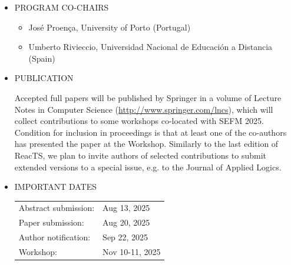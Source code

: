 \documentclass[prodmode,acmtecs]{acmsmall} %
\begin{document}
{\begin{itemize}
\begin{itemize}\item  FULL PAPERS up to 12 pages (excluding references) – to present original research and the analysis, interpretation and validation of the research findings.
\item  SHORT PRESENTATIONS up to 4 pages (excluding references) – to present work in progress and preliminary results.
\end{itemize} 
  Both kinds of submissions allow system descriptions,  to present a new tool, a new tool component or novel extensions to an existing tool aiming at supporting open community approaches, or the use/customisation of an existing tool in the context of RTS. Accepted full papers will be included in the workshop programme and will appear in the workshop LNCS proceedings. Accepted short presentations will be included in the pre-proceeding (available online before the Workshop) but not published in the LNCS proceedings. 
 
\item  PROGRAM CO-CHAIRS 
 
\begin{itemize}\item  José Proença, University of Porto (Portugal)
\item  Umberto Rivieccio, Universidad Nacional de Educación a Distancia (Spain)
\end{itemize} 
\item  PUBLICATION 
 
  Accepted full papers will be published by Springer in a volume of Lecture Notes in Computer Science (\href{http://www.springer.com/lncs}{http://www.springer.com/lncs}), which will collect contributions to some workshops co-located with SEFM 2025. Condition for inclusion in proceedings is that at least one of the co-authors has presented the paper at the Workshop. Similarly to the last edition of ReacTS, we plan to invite authors of selected contributions to submit extended versions to a special issue, e.g. to the Journal of Applied Logics. 
 
\item  IMPORTANT DATES 
 
\begin{tabulary}{\linewidth}{LL}Abstract submission:  & Aug 13, 2025 \\
Paper submission:  & Aug 20, 2025 \\
Author notification:  & Sep 22, 2025 \\
Workshop:  & Nov 10-11, 2025 \\
\end{tabulary}
 

\end{itemize}}
\end{document}
